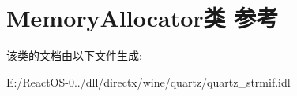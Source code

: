 \hypertarget{class_memory_allocator}{}\section{Memory\+Allocator类 参考}
\label{class_memory_allocator}


该类的文档由以下文件生成\+:\begin{DoxyCompactItemize}
\item 
E\+:/\+React\+O\+S-\/0../dll/directx/wine/quartz/quartz\+\_\+strmif.\+idl\end{DoxyCompactItemize}
